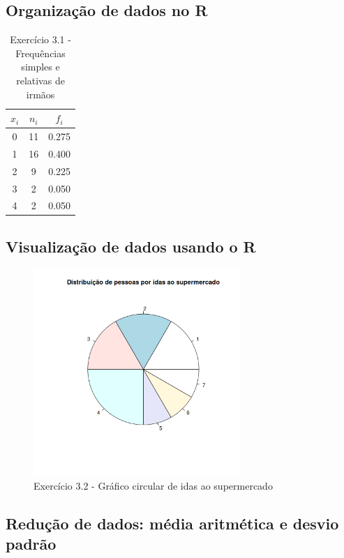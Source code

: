 \documentclass[11pt,a4paper]{article}
\begin{document}
\subsection{Organização de dados no R}

\begin{table}[h!]
	\centering
	\begin{tabular}{|c|c|c|}
		\hline
		$x_i$&$n_i$&$f_i$ \\
		\hline
		0&11&0.275\\
		\hline
		1&16&0.400\\
		\hline
		2& 9&0.225\\
		\hline
		3& 2&0.050\\
		\hline
		4& 2&0.050\\
		\hline
	\end{tabular}
	\caption{Exercício 3.1 - Frequências simples e relativas de irmãos}
\end{table}


\clearpage

\subsection{Visualização de dados usando o R}

\begin{figure}[h!]
	\centering
	\includegraphics[width=0.7\textwidth]{./recursos/ex3_2.png}
	\caption{Exercício 3.2 - Gráfico circular de idas ao supermercado}
\end{figure}


\clearpage
\subsection{Redução de dados: média aritmética e desvio padrão}
\end{document}
